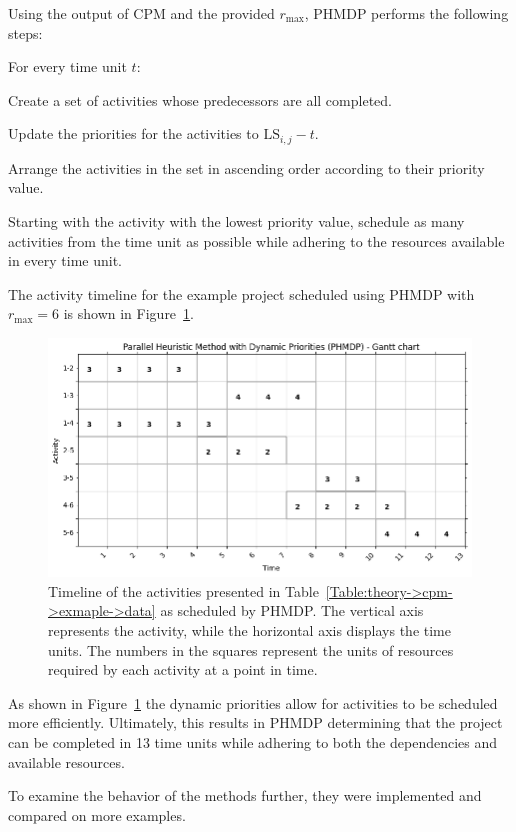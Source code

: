 Using the output of CPM and the provided $r_\mathrm{max}$, PHMDP performs the following steps:

\begin{tight_enumerate}
	\item For every time unit $t$:
	\begin{tight_enumerate}
		\item Create a set of activities whose predecessors are all completed.
		\item Update the priorities for the activities to $\mathrm{LS}_{i, j} - t$.
		\item Arrange the activities in the set in ascending order according to their priority value.
		\item Starting with the activity with the lowest priority value, schedule as many activities from the time unit as possible while adhering to the resources available in every time unit.
	\end{tight_enumerate}
\end{tight_enumerate}

The activity timeline for the example project scheduled using PHMDP with $r_\mathrm{max} = 6$ is shown in Figure~\ref{Figure:theory->phmdp->example->timeline}.

\begin{figure}[ht!]
	\centering
	\includegraphics[width=\linewidth]{images/phmdp_example_project.png}
	\caption{Timeline of the activities presented in Table~\ref{Table:theory->cpm->exmaple->data} as scheduled by PHMDP.
		The vertical axis represents the activity, while the horizontal axis displays the time units.
		The numbers in the squares represent the units of resources required by each activity at a point in time.
	}
	\label{Figure:theory->phmdp->example->timeline}
\end{figure}

As shown in Figure~\ref{Figure:theory->phmdp->example->timeline} the dynamic priorities allow for activities to be scheduled more efficiently.
Ultimately, this results in PHMDP determining that the project can be completed in 13 time units while adhering to both the dependencies and available resources.

To examine the behavior of the methods further, they were implemented and compared on more examples.

